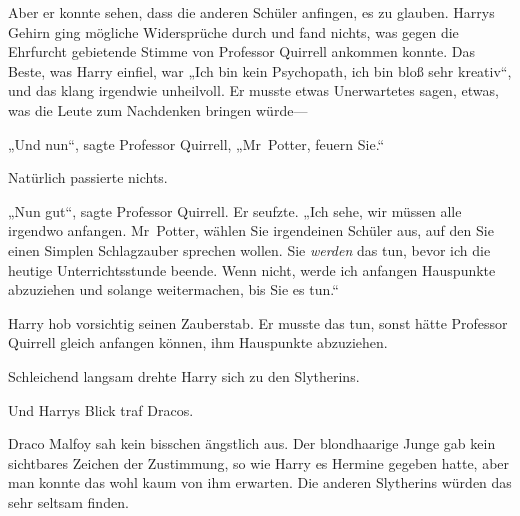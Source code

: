 Aber er konnte sehen, dass die anderen Schüler anfingen, es zu glauben. Harrys Gehirn ging mögliche Widersprüche durch und fand nichts, was gegen die Ehrfurcht gebietende Stimme von Professor Quirrell ankommen konnte. Das Beste, was Harry einfiel, war „Ich bin kein Psychopath, ich bin bloß sehr kreativ“, und das klang irgendwie unheilvoll. Er musste etwas Unerwartetes sagen, etwas, was die Leute zum Nachdenken bringen würde—

„Und nun“, sagte Professor Quirrell, „Mr~Potter, feuern Sie.“

Natürlich passierte nichts.

„Nun gut“, sagte Professor Quirrell. Er seufzte. „Ich sehe, wir müssen alle irgendwo anfangen. Mr~Potter, wählen Sie irgendeinen Schüler aus, auf den Sie einen Simplen Schlagzauber sprechen wollen. Sie \emph{werden} das tun, bevor ich die heutige Unterrichtsstunde beende. Wenn nicht, werde ich anfangen Hauspunkte abzuziehen und solange weitermachen, bis Sie es tun.“

Harry hob vorsichtig seinen Zauberstab. Er musste das tun, sonst hätte Professor Quirrell gleich anfangen können, ihm Hauspunkte abzuziehen.

Schleichend langsam drehte Harry sich zu den Slytherins.

Und Harrys Blick traf Dracos.

Draco Malfoy sah kein bisschen ängstlich aus. Der blondhaarige Junge gab kein sichtbares Zeichen der Zustimmung, so wie Harry es Hermine gegeben hatte, aber man konnte das wohl kaum von ihm erwarten. Die anderen Slytherins würden das sehr seltsam finden.

